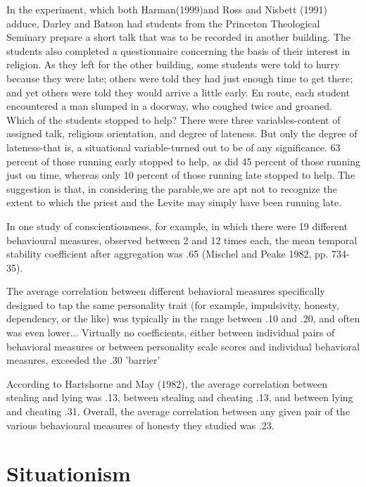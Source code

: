 \documentclass[11pt]{article}
\begin{document}
\noindent In the experiment, which both Harman(1999)and Ross and Nisbett (1991) adduce, Darley and Batson had students from the Princeton Theological Seminary prepare a short talk that was to be recorded in another building. The students also completed a questionnaire concerning the basis of their interest in religion. As they left for the other building, some students were told to hurry because they were late; others were told they had just enough time to get there; and yet others were told they would arrive a little early. En route, each student encountered a man slumped in a doorway, who coughed twice and groaned. Which of the students stopped to help? There were three variables-content of assigned talk, religious orientation, and degree of lateness. But only the degree of lateness-that is, a situational variable-turned out to be of any significance. 63 percent of those running early stopped to help, as did 45 percent of those running just on time, whereas only 10 percent of those running late stopped to help. The suggestion is that, in considering the parable,we are apt not to recognize the extent to which the priest and the Levite may simply have been running late.
\vspace*{4mm}

\noindent In one study of conscientiousness, for example, in which there were 19 different behavioural measures, observed between 2 and 12 times each, the mean temporal stability coefficient after aggregation was .65 (Mischel and Peake 1982, pp. 734-35). 
\vspace*{4mm}

\noindent The average correlation between different behavioral measures specifically
designed to tap the same personality trait (for example, impulsivity, honesty, dependency, or the like) was typically in the range between .10 and .20, and often was even lower... Virtually no coefficients, either between individual pairs of behavioral measures or between personality scale scores and individual behavioral measures, exceeded the .30 'barrier'
\vspace*{4mm}

\noindent According to Hartshorne and May (1982), the average correlation between stealing and lying was .13, between stealing and cheating .13, and between lying and cheating .31. Overall, the average correlation between any given pair of the various behavioural measures of honesty they studied was .23.
\newpage

\section{Situationism}
\end{document}
